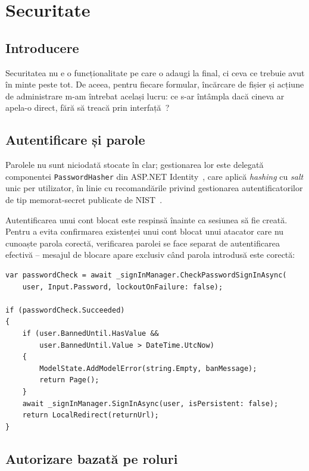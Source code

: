 \chapter{Securitate}

\section{Introducere}

Securitatea nu e o funcționalitate pe care o adaugi la final, ci ceva ce trebuie
avut în minte peste tot. De aceea, pentru fiecare formular, încărcare de fișier
și acțiune de administrare m-am întrebat același lucru: ce s-ar întâmpla dacă
cineva ar apela-o direct, fără să treacă prin interfață~\cite{owasp-top10}?

\section{Autentificare și parole}

Parolele nu sunt niciodată stocate în clar; gestionarea lor este delegată
componentei \texttt{PasswordHasher} din ASP.NET Identity~\cite{identity-docs},
care aplică \emph{hashing} cu \emph{salt} unic per utilizator, în linie cu
recomandările privind gestionarea autentificatorilor de tip memorat-secret
publicate de NIST~\cite{nist-800-63b}.

Autentificarea unui cont blocat este respinsă înainte ca sesiunea să fie creată.
Pentru a evita confirmarea existenței unui cont blocat unui atacator care nu
cunoaște parola corectă, verificarea parolei se face separat de autentificarea
efectivă -- mesajul de blocare apare exclusiv când parola introdusă este corectă:

\begin{lstlisting}[caption={Verificarea blocării unui cont, ulterior validării parolei}]
var passwordCheck = await _signInManager.CheckPasswordSignInAsync(
    user, Input.Password, lockoutOnFailure: false);

if (passwordCheck.Succeeded)
{
    if (user.BannedUntil.HasValue &&
        user.BannedUntil.Value > DateTime.UtcNow)
    {
        ModelState.AddModelError(string.Empty, banMessage);
        return Page();
    }
    await _signInManager.SignInAsync(user, isPersistent: false);
    return LocalRedirect(returnUrl);
}
\end{lstlisting}

\section{Autorizare bazată pe roluri}


